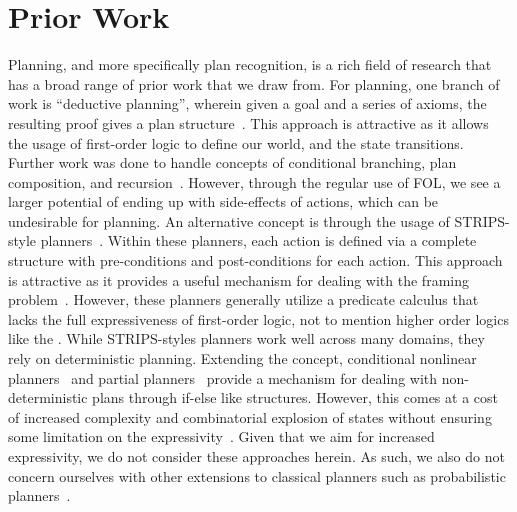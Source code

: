 \section{Prior Work}

Planning, and more specifically plan recognition, is a rich field of
research that has a broad range of prior work that we draw from. For planning,
one branch of work is ``deductive planning'', wherein given a goal and a series 
of axioms,
the resulting proof gives a plan structure~\cite{green_application_1969}. This
approach is attractive as it allows the usage of first-order logic to define
our world, and the state transitions. Further work was done to handle concepts
of conditional branching, plan composition, and 
recursion~\cite{metzing_plan_1989,biundo_deductive_1992,rosenschein_plan_1981}.
However, through the regular use of FOL, we see a larger potential of ending
up with side-effects of actions, which can be undesirable for planning. An
alternative concept is through the usage of STRIPS-style 
planners~\cite{fikes_strips_1971}. Within these planners, each action is
defined via a complete structure with pre-conditions and post-conditions for
each action. This approach is attractive as it provides a useful mechanism for
dealing with the framing problem~\cite{mccarthy_philosophical_1969}. However,
these planners generally utilize a predicate calculus that lacks the full
expressiveness of first-order logic, not to mention higher order logics like
the \CEC. While STRIPS-styles planners work well across many domains, they
rely on deterministic planning. Extending the concept, conditional nonlinear
planners~\cite{peot_conditional_1992} and partial 
planners~\cite{pryor_planning_1996}
provide a mechanism for dealing with non-deterministic plans through if-else
like structures. However, this comes at a cost of increased complexity and
combinatorial explosion of states without ensuring some limitation on the
expressivity~\cite{rintanen_constructing_1999}. Given that we aim for increased 
expressivity, we do not consider these approaches herein. As such, we also do
not concern ourselves with other extensions to classical planners such as 
probabilistic 
planners~\cite{boutilier_decision-theoretic_1999,kaelbling_planning_1998}.
